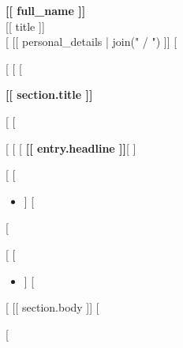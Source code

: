 \documentclass[10pt,a4paper]{article}
\begin{document}
\begin{center}
{\Huge \textbf{[[ full_name ]]}}\\[0.25em]
{\color{techblue}\large [[ title ]]}\\[0.5em]
[%
{\small\color{techgray} [[ personal_details | join(" / ") ]]}
[%
\end{center}

\vspace{0.8em}

[%
[%
[%
\noindent\colorbox{techblue}{\parbox{\dimexpr\textwidth-2\fboxsep\relax}{\color{white}\textbf{[[ section.title ]]}}}
[%
[%
\vspace{0.45em}

[%
[%
[%
\textcolor{techblue}{\textbf{[[ entry.headline ]]}}[%
\nopagebreak
[%
[%
[[ entry.body ]]

[%
[%
\begin{itemize}
[%
  \item [[ highlight ]]
[%
\end{itemize}
[%

[%
[%
\begin{itemize}
[%
  \item [[ item ]]
[%
\end{itemize}
[%
[[ section.body ]]
[%

\vspace{0.8em}
[%
\end{document}
